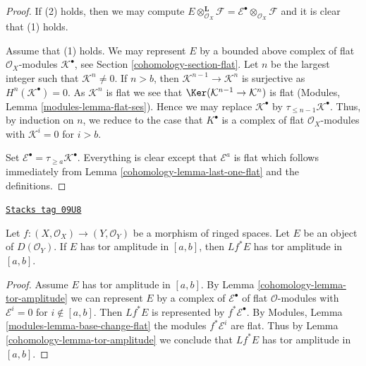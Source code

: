 \begin{proof}

If (2) holds, then we may compute
$E \otimes_{\mathcal{O}_X}^\mathbf{L} \mathcal{F} =
\mathcal{E}^\bullet \otimes_{\mathcal{O}_X} \mathcal{F}$
and it is clear that (1) holds.

\medskip\noindent
Assume that (1) holds. We may represent $E$ by a bounded above complex
of flat $\mathcal{O}_X$-modules $\mathcal{K}^\bullet$, see
Section \ref{cohomology-section-flat}.
Let $n$ be the largest integer such that $\mathcal{K}^n \not = 0$.
If $n > b$, then $\mathcal{K}^{n - 1} \to \mathcal{K}^n$ is surjective as
$H^n(\mathcal{K}^\bullet) = 0$. As $\mathcal{K}^n$ is flat we see that
$\Ker(\mathcal{K}^{n - 1} \to \mathcal{K}^n)$ is flat
(Modules, Lemma \ref{modules-lemma-flat-ses}).
Hence we may replace $\mathcal{K}^\bullet$ by
$\tau_{\leq n - 1}\mathcal{K}^\bullet$. Thus, by induction on $n$, we
reduce to the case that $K^\bullet$ is a complex of flat
$\mathcal{O}_X$-modules with $\mathcal{K}^i = 0$ for $i > b$.

\medskip\noindent
Set $\mathcal{E}^\bullet = \tau_{\geq a}\mathcal{K}^\bullet$.
Everything is clear except that $\mathcal{E}^a$ is flat
which follows immediately from Lemma \ref{cohomology-lemma-last-one-flat}
and the definitions.
\end{proof}

\begin{lemma}
\label{cohomology-lemma-tor-amplitude-pullback}
\href{https://stacks.math.columbia.edu/tag/09U8}{\texttt{Stacks tag 09U8}}

Let $f : (X, \mathcal{O}_X) \to (Y, \mathcal{O}_Y)$ be a morphism of ringed
spaces. Let $E$ be an object of $D(\mathcal{O}_Y)$.
If $E$ has tor amplitude in $[a, b]$, then $Lf^*E$ has tor amplitude in
$[a, b]$.
\end{lemma}

\begin{proof}

Assume $E$ has tor amplitude in $[a, b]$. By
Lemma \ref{cohomology-lemma-tor-amplitude}
we can represent $E$ by a complex of
$\mathcal{E}^\bullet$ of flat $\mathcal{O}$-modules with
$\mathcal{E}^i = 0$ for $i \not \in [a, b]$. Then
$Lf^*E$ is represented by $f^*\mathcal{E}^\bullet$.
By Modules, Lemma \ref{modules-lemma-base-change-flat}
the modules $f^*\mathcal{E}^i$ are flat.
Thus by Lemma \ref{cohomology-lemma-tor-amplitude}
we conclude that $Lf^*E$ has tor amplitude in $[a, b]$.
\end{proof}

